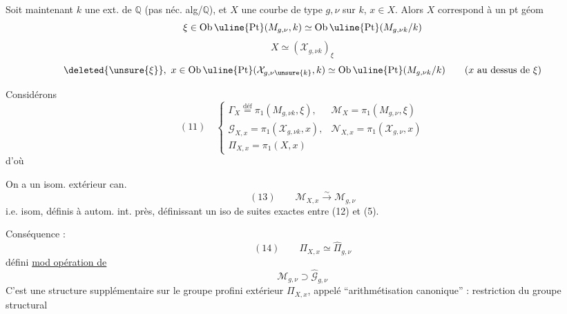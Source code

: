 Soit maintenant $k$ une ext.  de $\mathbb Q$ (pas néc. alg/$\mathbb Q$), et $X$ une courbe de type $g,\nu$ sur $k$, $x\in X$. Alors $X$ correspond à un pt géom
\[
\xi\in\operatorname{Ob}\uline{\mathrm{Pt}}(M_{g,\nu},k)\simeq\operatorname{Ob}\uline{\mathrm{Pt}}(M_{g,\nu k}/k)
\]
\[
X\simeq(\mathcal X_{g,\nu k})_\xi
\]
\[
\deleted{\unsure{\xi}},\ x\in\operatorname{Ob}\uline{\mathrm{Pt}}(\mathcal X_{g,\nu\unsure{k}},k)\simeq\operatorname{Ob}\uline{\mathrm{Pt}}(M_{g,\nu k}/k)\qquad(x\text{ au dessus de }\xi)
\]

\deleted{$\unsure{\Pi}$} Considérons
\[
(11)\quad\left\{\begin{array}{ll}
\Gamma_X\overset{\mathrm{déf}}=\pi_1(M_{g,\nu k},\xi),&\mathcal M_X=\pi_1(M_{g,\nu},\xi)\\
\mathcal G_{X,x}=\pi_1(\mathcal X_{g,\nu k},x),&\mathcal N_{X,x}=\pi_1(\mathcal X_{g,\nu},x)\\
\Pi_{X,x}=\pi_1(X,x)&
\end{array}\right.
\]
d'où

 On a un isom. extérieur can.  
\[
(13)\qquad\mathcal M_{X,x}\xrightarrow{\sim}\mathcal M_{g,\nu}
\]
i.e. isom, définis à autom. int. près, définissant un iso de suites exactes entre (12) et (5).

Conséquence :
\[
(14)\qquad\Pi_{X,x}\simeq\widehat\Pi_{g,\nu}
\]
 défini \uline{mod opération de}
\[
\mathcal M_{g,\nu}\supset\widehat{\mathcal G}_{g,\nu}
\]
C'est une structure supplémentaire  sur le groupe profini extérieur $\Pi_{X,x}$, appelé  ``arithmétisation canonique'' : restriction du groupe structural

